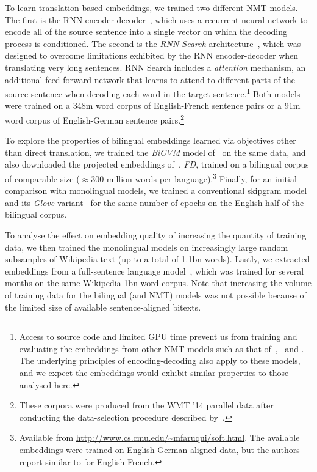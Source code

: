 \documentclass{article} %
\begin{document}
To learn translation-based embeddings, we trained two different NMT models. The first is the RNN encoder-decoder~\citep[\emph{RNNenc},][]{Cho2014}, which uses a recurrent-neural-network to encode all of the source sentence into a single vector on which the decoding process is conditioned. The second is the \emph{RNN Search} architecture~\citep{Bahdanau2014}, which was designed to overcome limitations exhibited by the RNN encoder-decoder when translating very long sentences. RNN Search includes a \emph{attention} mechanism, an additional feed-forward network that learns to attend to different parts of the source sentence when decoding each word in the target sentence.\footnote{Access to source code and limited GPU time prevent us from training and evaluating the embeddings from other NMT models such as that of~\citep{kalchbrenner13emnlp},~\citep{devlin2014fast} and \cite{Sutskever2014sequence}. The underlying principles of encoding-decoding also apply to these models, and we expect the embeddings would exhibit similar properties to those analysed here.} Both models were trained on a 348m word corpus of English-French sentence pairs or a 91m word corpus of English-German sentence pairs.\footnote{These corpora were produced from the WMT ’14 parallel data after conducting the data-selection procedure described by~\cite{Cho2014}. } 

To explore the properties of bilingual embeddings learned via objectives other than direct translation, we trained the \emph{BiCVM} model of~\cite{Hermann:2014:ICLR} on the same data, and also downloaded the projected embeddings of~\cite{faruqui2014improving}, \emph{FD}, trained on a bilingual corpus of comparable size (\(\approx 300\) million words per language).\footnote{Available from \url{http://www.cs.cmu.edu/~mfaruqui/soft.html}. The available embeddings were trained on English-German aligned data, but the authors report similar to for English-French.} Finally, for an initial comparison with monolingual models, we trained a conventional skipgram model~\citep{mikolov2013distributed} and its \emph{Glove} variant~\citep{Pennington2014} for the same number of epochs on the English half of the bilingual corpus. 

To analyse the effect on embedding quality of increasing the quantity of training data, we then trained the monolingual models on increasingly large random subsamples of Wikipedia text (up to a total of 1.1bn words). Lastly, we extracted embeddings from a full-sentence language model~\citep[\emph{CW},][]{collobert2008unified}, which was trained for several months on the same Wikipedia 1bn word corpus. Note that increasing the volume of training data for the bilingual (and NMT) models was not possible because of the limited size of available sentence-aligned bitexts. 
 
\end{document}

